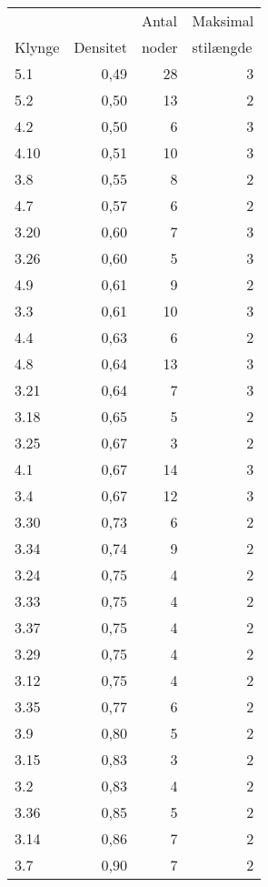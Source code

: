 \begin{tabular}{lrrr}
      &       & \multicolumn{1}{l}{Antal} & \multicolumn{1}{l}{Maksimal } \\
Klynge & \multicolumn{1}{l}{Densitet} & \multicolumn{1}{l}{noder} & \multicolumn{1}{l}{stilængde} \\
\midrule
5.1   & 0,49  & 28    & 3 \\
5.2   & 0,50  & 13    & 2 \\
4.2   & 0,50  & 6     & 3 \\
4.10  & 0,51  & 10    & 3 \\
3.8   & 0,55  & 8     & 2 \\
4.7   & 0,57  & 6     & 2 \\
3.20  & 0,60  & 7     & 3 \\
3.26  & 0,60  & 5     & 3 \\
4.9   & 0,61  & 9     & 2 \\
3.3   & 0,61  & 10    & 3 \\
4.4   & 0,63  & 6     & 2 \\
4.8   & 0,64  & 13    & 3 \\
3.21  & 0,64  & 7     & 3 \\
3.18  & 0,65  & 5     & 2 \\
3.25  & 0,67  & 3     & 2 \\
4.1   & 0,67  & 14    & 3 \\
3.4   & 0,67  & 12    & 3 \\
3.30  & 0,73  & 6     & 2 \\
3.34  & 0,74  & 9     & 2 \\
3.24  & 0,75  & 4     & 2 \\
3.33  & 0,75  & 4     & 2 \\
3.37  & 0,75  & 4     & 2 \\
3.29  & 0,75  & 4     & 2 \\
3.12  & 0,75  & 4     & 2 \\
3.35  & 0,77  & 6     & 2 \\
3.9   & 0,80  & 5     & 2 \\
3.15  & 0,83  & 3     & 2 \\
3.2   & 0,83  & 4     & 2 \\
3.36  & 0,85  & 5     & 2 \\
3.14  & 0,86  & 7     & 2 \\
3.7   & 0,90  & 7     & 2 \\
\bottomrule
\end{tabular}%